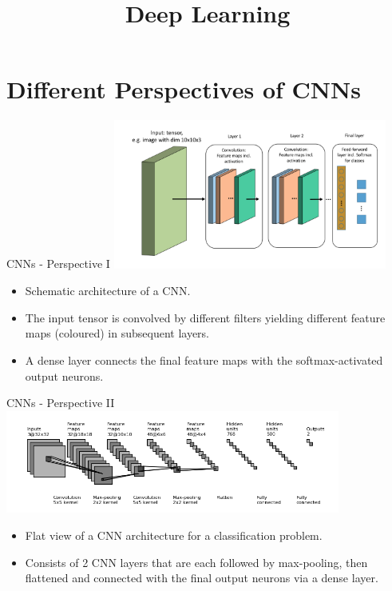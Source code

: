 




\newcommand{\titlefigure}{figure/alexnet.jpg}
\newcommand{\learninggoals}{
  \item Architecture
}

\title{Deep Learning}
\date{}




\section{Different Perspectives of CNNs}
\begin{vbframe}{CNNs - Perspective I}
\center
\includegraphics[width=9cm]{figure/cnn_scheme.png}
\begin{itemize}
\item Schematic architecture of a CNN.
\item The input tensor is convolved by different filters yielding different feature maps (coloured) in subsequent layers.
\item A dense layer connects the final feature maps with the softmax-activated output neurons.
\end{itemize}
\end{vbframe}

\begin{vbframe}{CNNs - Perspective II}
\center
\includegraphics[width=11cm]{figure/cnn_flat.png}
\begin{itemize}
\item Flat view of a CNN architecture for a classification problem.
\item Consists of 2 CNN layers that are each followed by max-pooling, then flattened and connected with the final output neurons via a dense layer.
\end{itemize}
\end{vbframe}

